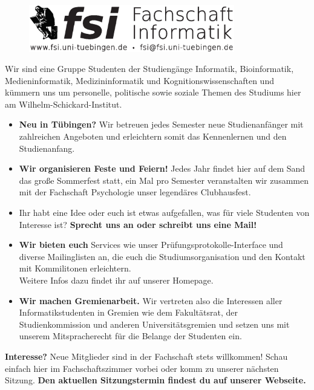 \documentclass[12pt,a4paper]{article}
\author{Tim}
\newcommand{\changefont}[3]{\fontfamily{#1} \fontseries{#2}
                            \fontshape{#3} \selectfont}
\begin{document}
	\thispagestyle{empty}
	\changefont{pag}{m}{n}
	\begin{figure}[h!]
		\centering
		\includegraphics[width=0.8\textwidth]{fsilogo.eps}
	\end{figure}
Wir sind eine Gruppe Studenten der Studiengänge Informatik, Bioinformatik, \\ Medieninformatik, Medizininformatik und Kognitionswissenschaften und kümmern uns um personelle, politische sowie soziale Themen des Studiums hier am Wilhelm-Schickard-Institut. \\
\begin{itemize}
	\item \textbf{Neu in Tübingen?} Wir betreuen jedes Semester neue Studienanfänger mit zahlreichen Angeboten und erleichtern somit das Kennenlernen und den Studienanfang.
	\item \textbf{Wir organisieren Feste und Feiern!} Jedes Jahr findet hier auf dem Sand das große Sommerfest statt, ein Mal pro Semester veranstalten wir zusammen mit der Fachschaft Psychologie unser legendäres Clubhausfest.
	\item Ihr habt eine Idee oder euch ist etwas aufgefallen, was für viele Studenten von Interesse ist? \textbf{Sprecht uns an oder schreibt uns eine Mail!}
	\item \textbf{Wir bieten euch} Services wie unser Prüfungsprotokolle-Interface und diverse Mailinglisten an, die euch die Studiumsorganisation und den Kontakt mit Kommilitonen erleichtern. \\ Weitere Infos dazu findet ihr auf unserer Homepage.
	\item \textbf{Wir machen Gremienarbeit.} Wir vertreten also die Interessen aller Informatikstudenten in Gremien wie dem Fakultätsrat, der Studienkommission und anderen Universitätsgremien und setzen uns mit unserem Mitspracherecht für die Belange der Studenten ein.
\end{itemize}

\textbf{Interesse?}
Neue Mitglieder sind in der Fachschaft stets willkommen! Schau einfach hier im Fachschaftszimmer vorbei oder komm zu unserer nächsten Sitzung.
\textbf{Den aktuellen Sitzungstermin findest du auf unserer Webseite.} \\
\vspace*{1cm} 
\end{document}
